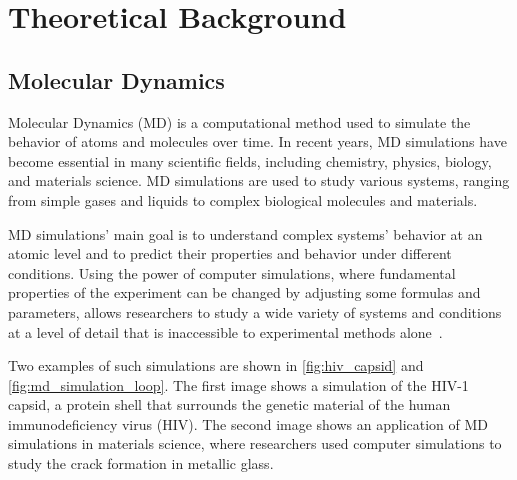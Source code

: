 \chapter{Theoretical Background}
\label{sec:theoretical_background}


\section{Molecular Dynamics}

Molecular Dynamics (MD) is a computational method used to simulate the behavior of atoms and molecules over time. In recent years, MD simulations have become essential in many scientific fields, including chemistry, physics, biology, and materials science. MD simulations are used to study various systems, ranging from simple gases and liquids to complex biological molecules and materials.

MD simulations' main goal is to understand complex systems' behavior at an atomic level and to predict their properties and behavior under different conditions. Using the power of computer simulations, where fundamental properties of the experiment can be changed by adjusting some formulas and parameters, allows researchers to study a wide variety of systems and conditions at a level of detail that is inaccessible to experimental methods alone~\cite{Perilla2017}.

Two examples of such simulations are shown in \autoref{fig:hiv_capsid} and \autoref{fig:md_simulation_loop}. The first image shows a simulation of the HIV-1 capsid, a protein shell that surrounds the genetic material of the human immunodeficiency virus (HIV). The second image shows an application of MD simulations in materials science, where researchers used computer simulations to study the crack formation in metallic glass.



